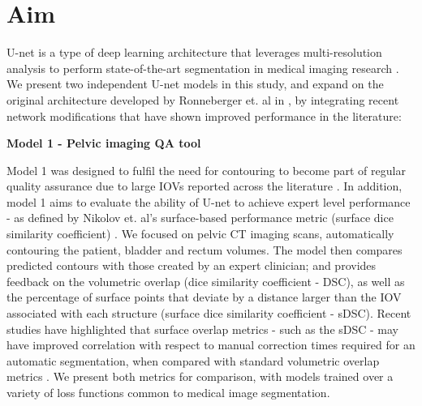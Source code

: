 \section{Aim}

U-net is a type of deep learning architecture that leverages multi-resolution analysis to perform state-of-the-art segmentation in medical imaging research \cite{Kazemifar_2018, Zhu_2018}. We present two independent U-net models in this study, and expand on the original architecture developed by Ronneberger et. al in \cite{Ronneberger_2015}, by integrating recent network modifications that have shown improved performance in the literature: 

\textbf{Model 1 - Pelvic imaging QA tool}

Model 1 was designed to fulfil the need for contouring to become part of regular quality assurance due to large IOVs reported across the literature \cite{Vinod_2016}. In addition, model 1 aims to evaluate the ability of U-net to achieve expert level performance - as defined by Nikolov et. al's surface-based performance metric (surface dice similarity coefficient) \cite{Nikolov_2018}. We focused on pelvic CT imaging scans, automatically contouring the patient, bladder and rectum volumes. The model then compares predicted contours with those created by an expert clinician; and provides feedback on the volumetric overlap (dice similarity coefficient - DSC), as well as the percentage of surface points that deviate by a distance larger than the IOV associated with each structure (surface dice similarity coefficient - sDSC). Recent studies have highlighted that surface overlap metrics - such as the sDSC - may have improved correlation with respect to manual correction times required for an automatic segmentation, when compared with standard volumetric overlap metrics \cite{Vaassen_2020}. We present both metrics for comparison, with models trained over a variety of loss functions common to medical image segmentation.


